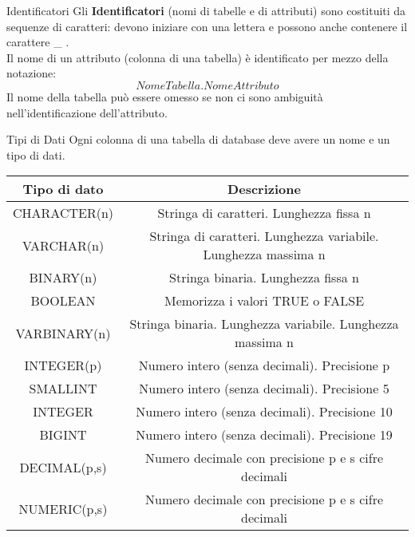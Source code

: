 \begin{frame}{Identificatori}
    Gli \textbf{Identificatori} (nomi di tabelle e di attributi) sono costituiti da sequenze di caratteri: devono iniziare con una lettera e possono anche contenere il carattere \_ .
    \newline
    \\ Il nome di un attributo (colonna di una tabella) \`e identificato per mezzo della notazione:
    \[ NomeTabella.NomeAttributo \]
    Il nome della tabella pu\`o essere omesso se non ci sono ambiguit\`a nell'identificazione dell'attributo.
\end{frame}
%
\begin{frame}[allowframebreaks]{Tipi di Dati}
    Ogni colonna di una tabella di database deve avere un nome e un tipo di dati.
    \centering
    \begin{tabular}{|c|c|}
        \hline
        \rowcolor{cyan!30}Tipo di dato & Descrizione \\
        \hline
        CHARACTER(n) & Stringa di caratteri. Lunghezza fissa n \\ \hline
        VARCHAR(n) & Stringa di caratteri. Lunghezza variabile. Lunghezza massima n \\ \hline
        BINARY(n) & Stringa binaria. Lunghezza fissa n \\ \hline
        BOOLEAN & Memorizza i valori TRUE o FALSE \\ \hline
        VARBINARY(n) & Stringa binaria. Lunghezza variabile. Lunghezza massima n \\ \hline
        INTEGER(p) & Numero intero (senza decimali). Precisione p \\ \hline
        SMALLINT & Numero intero (senza decimali). Precisione 5 \\ \hline
        INTEGER	& Numero intero (senza decimali). Precisione 10 \\ \hline
        BIGINT & Numero intero (senza decimali). Precisione 19 \\ \hline
        DECIMAL(p,s) & Numero decimale con precisione p e s cifre decimali \\ \hline
        NUMERIC(p,s) & Numero decimale con precisione p e s cifre decimali \\ \hline
        \end{tabular}


\end{frame}
